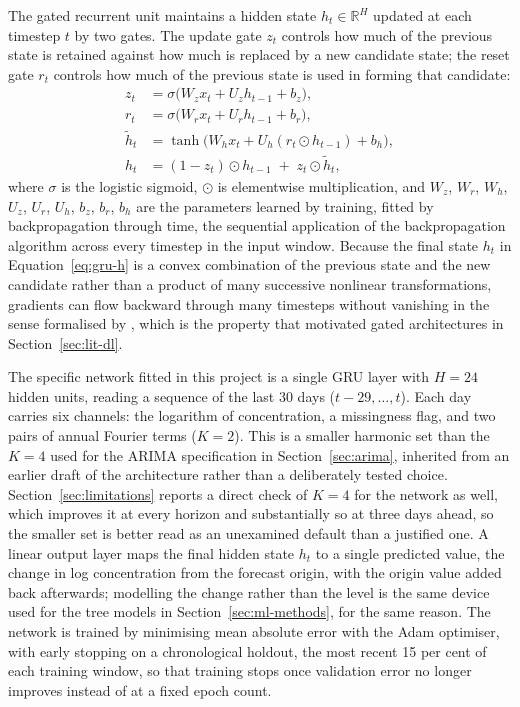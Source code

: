 \documentclass[12pt,a4paper]{report}
\begin{document}
The gated recurrent unit \citep{cho2014gru} maintains a hidden state
$h_t \in \mathbb{R}^H$ updated at each timestep $t$ by two gates. The update
gate $z_t$ controls how much of the previous state is retained against how
much is replaced by a new candidate state; the reset gate $r_t$ controls how
much of the previous state is used in forming that candidate:
\begin{align}
z_t &= \sigma\big(W_z x_t + U_z h_{t-1} + b_z\big), \label{eq:gru-z}\\
r_t &= \sigma\big(W_r x_t + U_r h_{t-1} + b_r\big), \label{eq:gru-r}\\
\tilde h_t &= \tanh\big(W_h x_t + U_h (r_t \odot h_{t-1}) + b_h\big), \label{eq:gru-htilde}\\
h_t &= (1-z_t)\odot h_{t-1} \;+\; z_t \odot \tilde h_t, \label{eq:gru-h}
\end{align}
where $\sigma$ is the logistic sigmoid, $\odot$ is elementwise
multiplication, and $W_z$, $W_r$, $W_h$, $U_z$, $U_r$, $U_h$, $b_z$, $b_r$,
$b_h$ are the parameters
learned by training, fitted by backpropagation through time, the sequential
application of the backpropagation algorithm \citep{rumelhart1986backprop}
across every timestep in the input window. Because the final state $h_t$ in
Equation~\ref{eq:gru-h} is a convex combination of the previous state and the
new candidate rather than a product of many successive nonlinear
transformations, gradients can flow backward through many timesteps without
vanishing in the sense formalised by \citet{bengio1994vanishing}, which is
the property that motivated gated architectures in Section~\ref{sec:lit-dl}.

The specific network fitted in this project is a single GRU layer with
$H=24$ hidden units, reading a sequence of the last 30 days
($t-29,\dots,t$). Each day carries six channels: the logarithm of
concentration, a missingness flag, and two pairs of annual Fourier terms
($K=2$). This is a smaller harmonic set than the $K=4$ used for the ARIMA
specification in Section~\ref{sec:arima}, inherited from an earlier draft
of the architecture rather than a deliberately tested choice.
Section~\ref{sec:limitations} reports a direct check of $K=4$ for the
network as well, which improves it at every horizon and substantially so
at three days ahead, so the smaller set is better read as an unexamined
default than a justified one. A linear output layer maps the final hidden
state $h_t$ to a single predicted value, the change in log concentration
from the forecast origin, with the origin value added back afterwards;
modelling the change rather than the level is the same device used for the
tree models in Section~\ref{sec:ml-methods}, for the same reason. The
network is trained by minimising mean absolute error with the Adam
optimiser, with early stopping on a chronological holdout, the most recent
15 per cent of each training window, so that training stops once
validation error no longer improves instead of at a fixed epoch count.
\end{document}
